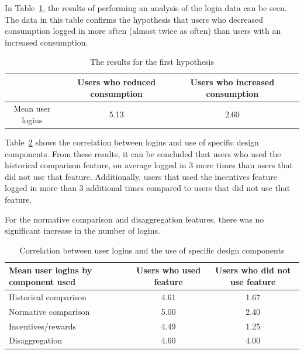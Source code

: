 \documentclass[journal]{vgtc}                %
\begin{document}
In Table~\ref{hypo1}, the results of performing an analysis of the login data can be seen. The data in this table confirms the hypothesis that users who decreased consumption logged in more often (almost twice as often) than users with an increased consumption. 

\begin{table}[h]
  \caption{The results for the first hypothesis \cite{jain2012assessing}}
  \label{hypo1}
  \scriptsize
  \begin{center}
    \begin{tabular}{cccc}
    \multicolumn{1}{p{1cm}}{\centering } &
       \multicolumn{1}{p{2.5cm}}{\centering Users who reduced consumption} &
       \multicolumn{1}{p{2.5cm}}{\centering Users who increased consumption} \\
    \hline
      Mean user logins &  5.13 & 2.60\\

    \end{tabular}
  \end{center}
\end{table}

Table~\ref{hypo2} shows the correlation between logins and use of specific design components. From these results, it can be concluded that users who used the historical comparison feature, on average logged in 3 more times than users that did not use that feature. Additionally, users that used the incentives feature logged in more than 3 additional times compared to users that did not use that feature.

For the normative comparison and disaggregation features, there was no significant increase in the number of logins. 

\begin{table}
  \caption{Correlation between user logins and the use of specific design components \cite{jain2012assessing}}
  \label{hypo2}
  \scriptsize
  \begin{center}
    \begin{tabular}{lcc}
    \multicolumn{1}{p{2.5cm}}{\centering Mean user logins by component used} &
       \multicolumn{1}{p{2.0cm}}{\centering Users who used feature} &
       \multicolumn{1}{p{2.0cm}}{\centering Users who did not use feature} \\
    \hline
      Historical comparison &  4.61 & 1.67 \\
      Normative comparison &  5.00 & 2.40 \\
      Incentives/rewards &  4.49 & 1.25 \\
      Disaggregation &  4.60 & 4.00 \\

    \end{tabular}
  \end{center}
\end{table}
\end{document}
